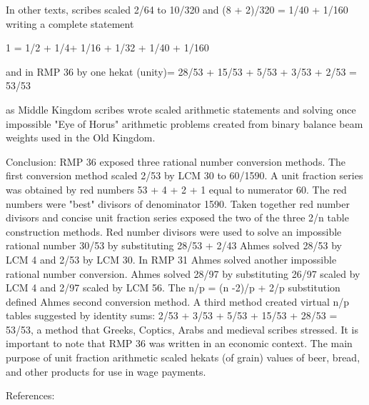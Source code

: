 \documentclass[12pt]{article}
\begin{document}
In other texts, scribes scaled 2/64 to 10/320 and (8 + 2)/320 = 1/40 + 1/160 writing a complete statement

1 = 1/2 + 1/4+ 1/16 + 1/32 + 1/40 + 1/160 

and in RMP 36 by one hekat (unity)= 28/53 + 15/53 + 5/53 + 3/53 + 2/53 = 53/53

as Middle Kingdom scribes wrote scaled arithmetic statements and solving once impossible "Eye of Horus" arithmetic problems created from binary balance beam weights used in the Old Kingdom.

Conclusion: RMP 36 exposed three rational number conversion methods. The first conversion method scaled 2/53 by LCM 30 to 60/1590. A unit fraction series was obtained by red numbers 53 + 4 + 2 + 1 equal to numerator 60. The red numbers were "best" divisors of denominator 1590. Taken together red number divisors and concise unit fraction series exposed the two of the three 2/n table construction methods. Red number divisors were used to solve an impossible rational number 30/53 by substituting 28/53 + 2/43 Ahmes solved 28/53 by LCM 4 and 2/53 by LCM 30. In RMP 31 Ahmes solved another impossible rational number conversion. Ahmes solved 28/97 by substituting 26/97 scaled by LCM 4 and 2/97 scaled by LCM 56. The n/p = (n -2)/p + 2/p substitution defined Ahmes second conversion method. A third method created virtual n/p tables suggested by identity sums: 2/53 + 3/53 + 5/53 + 15/53 + 28/53 = 53/53, a method that Greeks, Coptics, Arabs and medieval scribes stressed. It is important to note that RMP 36 was written in an economic context. The main purpose of unit fraction arithmetic scaled hekats (of grain) values of beer, bread, and other  products for use in wage payments. 

References:




\end{document}

